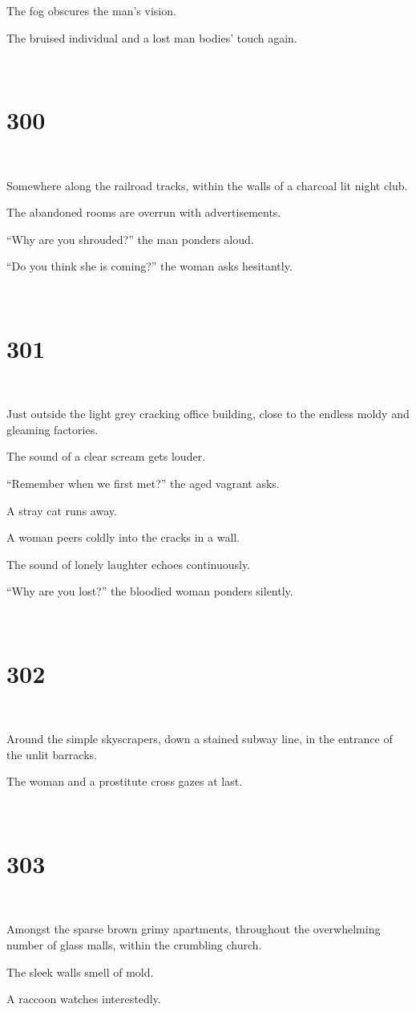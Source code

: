 \documentclass{report}
\begin{document}
The fog obscures the man's vision.

The bruised individual and a lost man bodies' touch again.

~
\chapter*{300}
~

Somewhere along the railroad tracks, within the walls of a charcoal lit night club.

The abandoned rooms are overrun with advertisements.

``Why are you shrouded?'' the man ponders aloud.

``Do you think she is coming?'' the woman asks hesitantly.

~
\chapter*{301}
~

Just outside the light grey cracking office building, close to the endless moldy and gleaming factories.

The sound of a clear scream gets louder.

``Remember when we first met?'' the aged vagrant asks.

A stray cat runs away.

A woman peers coldly into the cracks in a wall.

The sound of lonely laughter echoes continuously.

``Why are you lost?'' the bloodied woman ponders silently.

~
\chapter*{302}
~

Around the simple skyscrapers, down a stained subway line, in the entrance of the unlit barracks.

The woman and a prostitute cross gazes at last.

~
\chapter*{303}
~

Amongst the sparse brown grimy apartments, throughout the overwhelming number of glass malls, within the crumbling church.

The sleek walls smell of mold.

A raccoon watches interestedly.
\end{document}
